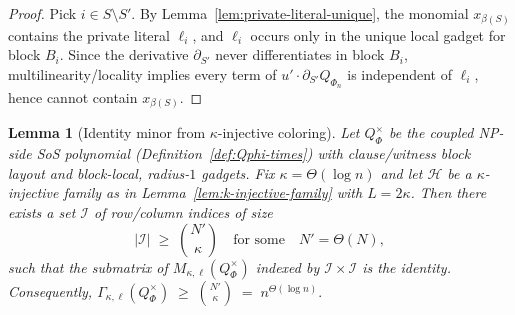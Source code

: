 \documentclass[12pt]{article}
\newtheorem{lemma}[theorem]{Lemma}
\theoremstyle{definition}
\theoremstyle{definition}
\theoremstyle{remark}
\theoremstyle{remark}
\begin{document}
\begin{proof}
Pick $i\in S\setminus S'$. By Lemma~\ref{lem:private-literal-unique}, the monomial
$x_{\beta(S)}$ contains the private literal $\ell_i$, and $\ell_i$ occurs only in the unique
local gadget for block $B_i$. Since the derivative $\partial_{S'}$ never differentiates in
block $B_i$, multilinearity/locality implies every term of $u'\cdot \partial_{S'} Q_{\Phi_n}$
is independent of $\ell_i$, hence cannot contain $x_{\beta(S)}$.
\end{proof}

\begin{lemma}[Identity minor from $\kappa$-injective coloring]
\label{lem:identity-minor-k-injective}
Let $Q^{\times}_\Phi$ be the coupled NP-side SoS polynomial (Definition~\ref{def:Qphi-times}) with clause/witness block layout and block-local,
radius-$1$ gadgets. Fix $\kappa=\Theta(\log n)$ and let $\mathcal H$ be a $\kappa$-injective family as in
Lemma~\ref{lem:k-injective-family} with $L=2\kappa$. Then there exists a set $\mathcal I$ of
row/column indices of size
\[
|\mathcal I| \;\ge\; \binom{N'}{\kappa}
\quad\text{for some}\quad N'=\Theta(N),
\]
such that the submatrix of $M_{\kappa,\ell}(Q^{\times}_\Phi)$ indexed by $\mathcal I\times\mathcal I$ is the identity.
Consequently,
\(
\Gamma_{\kappa,\ell}(Q^{\times}_\Phi)\;\ge\;\binom{N'}{\kappa}\;=\;n^{\Theta(\log n)}.
\)
\end{lemma}
\end{document}
